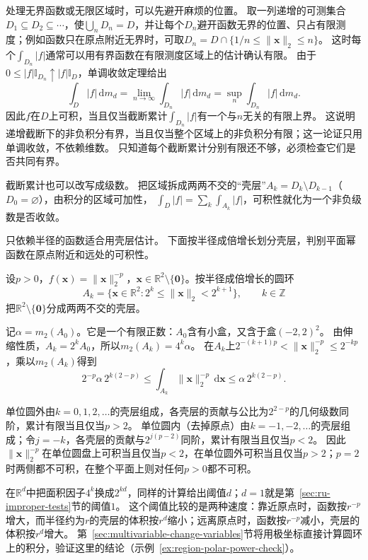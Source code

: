 处理无界函数或无限区域时，可以先避开麻烦的位置。
取一列递增的可测集合$D_1\subseteq D_2\subseteq\cdots$，使$\bigcup_nD_n=D$，并让每个$D_n$避开函数无界的位置、只占有限测度；例如函数只在原点附近无界时，可取$D_n=D\cap\{1/n\leq\lVert\bm x\rVert_2\leq n\}$。
这时每个$\int_{D_n}|f|$通常可以用有界函数在有限测度区域上的估计确认有限。
由于$0\leq|f|\mathbb I_{D_n}\uparrow|f|\mathbb I_D$，单调收敛定理给出
\[
 \int_D|f|\,\mathrm dm_d
 =\lim_{n\to\infty}\int_{D_n}|f|\,\mathrm dm_d
 =\sup_n\int_{D_n}|f|\,\mathrm dm_d.
\]
因此$f$在$D$上可积，当且仅当截断累计$\int_{D_n}|f|$有一个与$n$无关的有限上界。
这说明递增截断下的非负积分有界，当且仅当整个区域上的非负积分有限；这一论证只用单调收敛，不依赖维数。
只知道每个截断累计分别有限还不够，必须检查它们是否共同有界。

截断累计也可以改写成级数。
把区域拆成两两不交的“壳层”$A_k=D_k\setminus D_{k-1}$（$D_0=\varnothing$），由积分的区域可加性，
$\int_D|f|=\sum_k\int_{A_k}|f|$，可积性就化为一个非负级数是否收敛。

只依赖半径的函数适合用壳层估计。
下面按半径成倍增长划分壳层，判别平面幂函数在原点附近和远处的可积性。
\begin{example}
\label{ex:region-power-function-threshold}
设$p>0$，$f(\bm x)=\lVert\bm x\rVert_2^{-p}$，$\bm x\in\mathbb R^2\setminus\{\bm 0\}$。按半径成倍增长的圆环
\[
 A_k=\{\bm x\in\mathbb R^2:2^k\leq\lVert\bm x\rVert_2<2^{k+1}\},\qquad k\in\mathbb Z
\]
把$\mathbb R^2\setminus\{\bm 0\}$分成两两不交的壳层。

记$\alpha=m_2(A_0)$。它是一个有限正数：$A_0$含有小盒，又含于盒$(-2,2)^2$。
由伸缩性质，$A_k=2^kA_0$，所以$m_2(A_k)=4^k\alpha$。
在$A_k$上$2^{-(k+1)p}<\lVert\bm x\rVert_2^{-p}\leq2^{-kp}$，乘以$m_2(A_k)$得到
\[
 2^{-p}\alpha\,2^{k(2-p)}\leq\int_{A_k}\lVert\bm x\rVert_2^{-p}\,\mathrm d\bm x\leq\alpha\,2^{k(2-p)}.
\]

单位圆外由$k=0,1,2,\ldots$的壳层组成，各壳层的贡献与公比为$2^{2-p}$的几何级数同阶，累计有限当且仅当$p>2$。
单位圆内（去掉原点）由$k=-1,-2,\ldots$的壳层组成；令$j=-k$，各壳层的贡献与$2^{j(p-2)}$同阶，累计有限当且仅当$p<2$。
因此$\lVert\bm x\rVert_2^{-p}$在单位圆盘上可积当且仅当$p<2$，在单位圆外可积当且仅当$p>2$；$p=2$时两侧都不可积，在整个平面上则对任何$p>0$都不可积。
\end{example}

在$\mathbb R^d$中把面积因子$4^k$换成$2^{kd}$，同样的计算给出阈值$d$；$d=1$就是第~\ref{sec:ru-improper-tests}节的阈值$1$。
这个阈值比较的是两种速度：靠近原点时，函数按$r^{-p}$增大，而半径约为$r$的壳层的体积按$r^d$缩小；远离原点时，函数按$r^{-p}$减小，壳层的体积按$r^d$增大。
第~\ref{sec:multivariable-change-variables}节将用极坐标直接计算圆环上的积分，验证这里的结论（示例~\ref{ex:region-polar-power-check}）。

